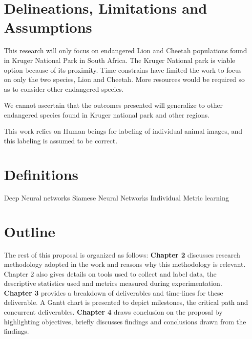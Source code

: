 \section{Delineations, Limitations and Assumptions}

This research will only focus on endangered Lion and Cheetah populations found in Kruger National Park in South Africa. The Kruger National park is viable option because of its proximity. Time constrains have limited the work to focus on only the two species, Lion and Cheetah. More resources would be required so as to consider other endangered species.

We cannot ascertain that the outcomes presented will generalize to other endangered species found in Kruger national park and other regions.

This work relies on Human beings for labeling of individual animal images, and this labeling is assumed to be correct.

\section{Definitions}
Deep Neural networks \newline
Siamese Neural Networks \newline
Individual \newline
Metric learning \newline

\section{Outline}
The rest of this proposal is organized as follows: \textbf{Chapter 2} discusses research methodology adopted in the work and reasons why this methodology is relevant. Chapter 2 also gives details on tools used to collect and label data, the descriptive statistics used and metrics measured during experimentation. \textbf{Chapter 3} provides a breakdown of deliverables and time-lines for these deliverable. A Gantt chart is presented to depict milestones, the critical path and concurrent deliverables. \textbf{Chapter 4} draws conclusion on the proposal by highlighting objectives, briefly discusses findings and conclusions drawn from the findings.  

